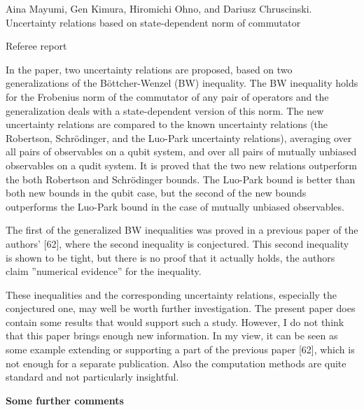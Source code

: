 \documentclass[12pt]{article}
\begin{document}
\begin{center}
{\large Aina Mayumi, Gen Kimura, Hiromichi Ohno, and Dariusz Chruscinski. Uncertainty relations based on state-dependent norm of commutator
 }

\end{center}
\medskip

\centerline{Referee report}

\bigskip

In the paper, two uncertainty relations are proposed, based on two generalizations of the
B\"ottcher-Wenzel (BW) inequality. The BW inequality holds for the Frobenius norm of the
commutator of any pair of operators and the generalization deals with a state-dependent
version of this norm.  The new uncertainty relations  are compared to the known
uncertainty relations (the Robertson, Schr\"odinger, and the  Luo-Park uncertainty
relations), averaging over all pairs of observables on a qubit system, and over all pairs
of mutually unbiased observables on a qudit system. It is proved that the two new
relations outperform the both Robertson and Schr\"odinger bounds. The Luo-Park bound
is better than both new bounds in the qubit case, but the second of the new bounds
outperforms the Luo-Park bound in the case of mutually unbiased observables. 

The first of the generalized BW inequalities was proved in a previous paper of the
authors' [62], where the second inequality is conjectured. This second inequality is shown
to be tight, but there is no proof that it actually holds, the authors claim ''numerical
evidence'' for the inequality. 

These inequalities and the corresponding uncertainty relations, especially the conjectured
one, may well be worth further investigation. The present paper does contain some results that
would support such a study.  However,  I do not think that this paper brings enough new information. In
my view, it can be seen as some example extending or supporting a part of the previous
paper [62], which is not enough for a separate publication.  Also the computation methods are quite standard and not particularly
insightful. 


\medskip

\noindent
\textbf{Some further comments}
\end{document}

